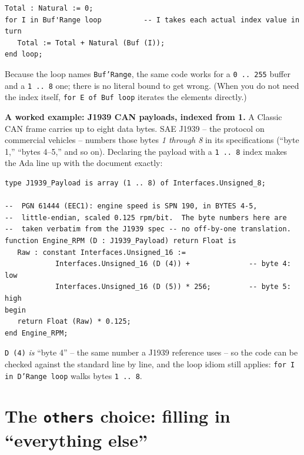 \begin{lstlisting}
Total : Natural := 0;
for I in Buf'Range loop          -- I takes each actual index value in turn
   Total := Total + Natural (Buf (I));
end loop;
\end{lstlisting}

Because the loop names \texttt{Buf'Range}, the same code works for a
\texttt{0\,..\,255} buffer and a \texttt{1\,..\,8} one; there is no literal bound
to get wrong. (When you do not need the index itself, \texttt{for E of Buf loop}
iterates the elements directly.)

\textbf{A worked example: J1939 CAN payloads, indexed from 1.} A Classic CAN
frame carries up to eight data bytes. SAE J1939 -- the protocol on commercial
vehicles -- numbers those bytes \emph{1 through 8} in its specifications
(``byte 1,'' ``bytes 4--5,'' and so on). Declaring the payload with a
\texttt{1\,..\,8} index makes the Ada line up with the document exactly:

\begin{lstlisting}
type J1939_Payload is array (1 .. 8) of Interfaces.Unsigned_8;

--  PGN 61444 (EEC1): engine speed is SPN 190, in BYTES 4-5,
--  little-endian, scaled 0.125 rpm/bit.  The byte numbers here are
--  taken verbatim from the J1939 spec -- no off-by-one translation.
function Engine_RPM (D : J1939_Payload) return Float is
   Raw : constant Interfaces.Unsigned_16 :=
            Interfaces.Unsigned_16 (D (4)) +              -- byte 4: low
            Interfaces.Unsigned_16 (D (5)) * 256;         -- byte 5: high
begin
   return Float (Raw) * 0.125;
end Engine_RPM;
\end{lstlisting}

\texttt{D (4)} \emph{is} ``byte 4'' -- the same number a J1939 reference uses --
so the code can be checked against the standard line by line, and the loop idiom
still applies: \texttt{for I in D'Range loop} walks bytes \texttt{1\,..\,8}.


\section{The \texttt{others} choice: filling in ``everything else''}
\label{sec:others}


